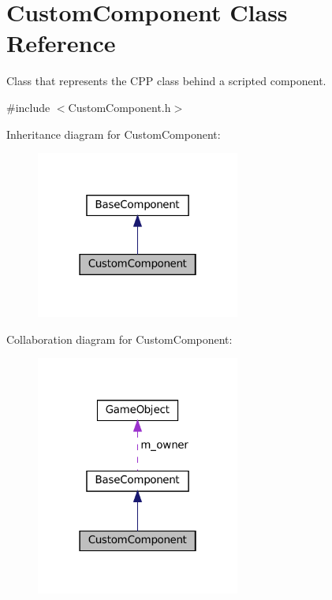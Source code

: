 \hypertarget{classCustomComponent}{}\section{Custom\+Component Class Reference}
\label{classCustomComponent}


Class that represents the C\+PP class behind a scripted component.  




{\ttfamily \#include $<$Custom\+Component.\+h$>$}



Inheritance diagram for Custom\+Component\+:
\nopagebreak
\begin{figure}[H]
\begin{center}
\leavevmode
\includegraphics[width=190pt]{classCustomComponent__inherit__graph}
\end{center}
\end{figure}


Collaboration diagram for Custom\+Component\+:
\nopagebreak
\begin{figure}[H]
\begin{center}
\leavevmode
\includegraphics[width=190pt]{classCustomComponent__coll__graph}
\end{center}
\end{figure}
